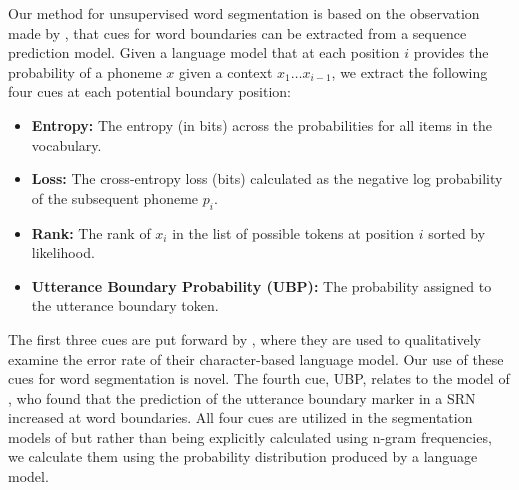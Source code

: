 Our method for unsupervised word segmentation is based on the observation made by \citet{elman-1990-finding}, that cues for word boundaries can be extracted from a sequence prediction model. Given a language model that at each position $i$ provides the probability of a phoneme $x$ given a context $x_1\ldots x_{i-1}$, we extract the following four cues at each potential boundary position:


\begin{itemize}[leftmargin=*]
    \item \textbf{Entropy:} The entropy (in bits) across the probabilities for all items in the vocabulary.%
    \item \textbf{Loss:} The cross-entropy loss (bits) calculated as the negative log probability of the subsequent phoneme $p_i$.
    \item \textbf{Rank:} The rank of $x_i$ in the list of possible tokens at position $i$ sorted by likelihood.
    \item \textbf{Utterance Boundary Probability (UBP):} The probability assigned to the utterance boundary token.
\end{itemize}

The first three cues are put forward by \citet{al-rfou_character-level_2019}, where they are used to qualitatively examine the error rate of their character-based language model. Our use of these cues for word segmentation is novel. The fourth cue, UBP, relates to the model of \citet{christiansen1998learning}, who found that the prediction of the utterance boundary marker in a SRN increased at word boundaries. All four cues are utilized in the segmentation models of \citet{ccoltekin2014explicit, goriely2023word} but rather than being explicitly calculated using n-gram frequencies, we calculate them using the probability distribution produced by a language model.

